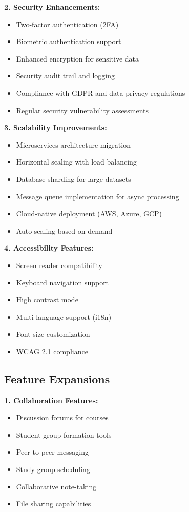 \textbf{2. Security Enhancements:}
\begin{itemize}
    \item Two-factor authentication (2FA)
    \item Biometric authentication support
    \item Enhanced encryption for sensitive data
    \item Security audit trail and logging
    \item Compliance with GDPR and data privacy regulations
    \item Regular security vulnerability assessments
\end{itemize}

\textbf{3. Scalability Improvements:}
\begin{itemize}
    \item Microservices architecture migration
    \item Horizontal scaling with load balancing
    \item Database sharding for large datasets
    \item Message queue implementation for async processing
    \item Cloud-native deployment (AWS, Azure, GCP)
    \item Auto-scaling based on demand
\end{itemize}

\textbf{4. Accessibility Features:}
\begin{itemize}
    \item Screen reader compatibility
    \item Keyboard navigation support
    \item High contrast mode
    \item Multi-language support (i18n)
    \item Font size customization
    \item WCAG 2.1 compliance
\end{itemize}

\subsection{Feature Expansions}

\textbf{1. Collaboration Features:}
\begin{itemize}
    \item Discussion forums for courses
    \item Student group formation tools
    \item Peer-to-peer messaging
    \item Study group scheduling
    \item Collaborative note-taking
    \item File sharing capabilities
\end{itemize}

